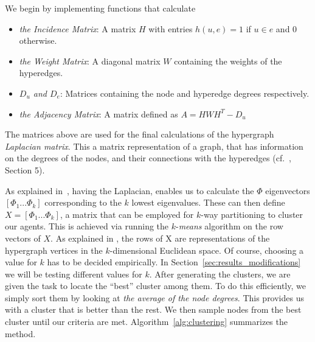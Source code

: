 We begin by implementing functions that calculate
\begin{itemize}
	\item{\em the Incidence Matrix}: A %
	matrix $H$ with entries $h(u,e) = 1$ if $u \in e$ and $0$ otherwise.
	\item{\em the Weight Matrix}: A diagonal matrix $W$ containing the weights of the hyperedges.
	\item{\em $D_u$ and $D_e$}: Matrices containing the node and hyperedge degrees respectively.
	\item{\em the Adjacency Matrix}: A matrix defined as $A = HWH^T - D_u$
\end{itemize}
The matrices above are used for the final calculations of the hypergraph \textit{Laplacian matrix}. This a matrix representation of a graph, that has information on the degrees of the nodes, and their connections with the hyperedges (cf.~\cite{zhou2006learning}, Section 5). 

As explained in~\cite{zhou2006learning}, having the Laplacian, enables us to calculate the $\Phi$ eigenvectors $[\Phi_1 ... \Phi_k]$ corresponding to the $k$ lowest eigenvalues. These can then define $X = [\Phi_1 ... \Phi_k]$, a matrix that can be employed for $k$-way partitioning to cluster our agents. This is achieved via running the $k$-{\em means} algorithm \cite{hartigan1979algorithm} on the row vectors of $X$\cite{zhou2006learning}. As explained in \cite{zhou2006learning}, the rows of X are representations of the hypergraph vertices in the $k$-dimensional Euclidean space. Of course, choosing a value for $k$ has to be decided empirically. In Section~\ref{sec:results_modifications} we will be testing different values for $k$. 
After generating the clusters, we are given the task to locate the ``best'' cluster among them. To do this efficiently, we simply sort them by looking at {\em the average of the node degrees}.
This provides us with a cluster that is better than the rest. We then sample nodes from the best cluster until our criteria are met. Algorithm~\ref{alg:clustering} summarizes the method.

